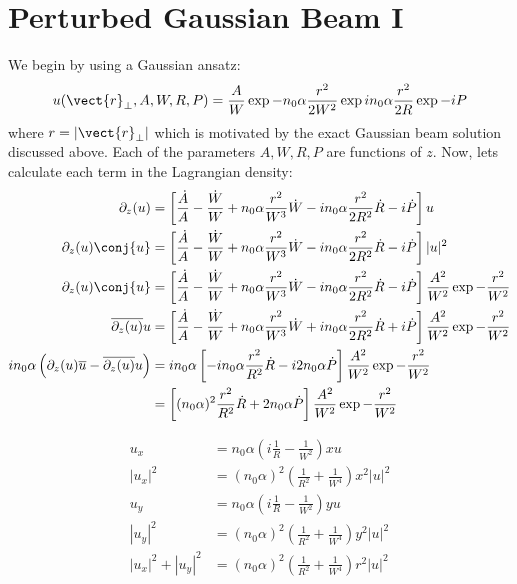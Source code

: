 \section{Perturbed Gaussian Beam I}
We begin by using a Gaussian ansatz:
\begin{equation}
 u(\vect{r}_{\perp},A,W,R,P) = \frac{A}{W} \exp{-n_0 \alpha \frac{r^2}{2W^2}} \exp{ i n_0 \alpha \frac{r^2}{2R}} \exp{- i P }
\end{equation}
where $r = |\vect{r}_{\perp}|$ which is motivated by the exact Gaussian beam solution discussed above.   Each of the parameters $A,W,R,P$ are functions of $z$.  Now, lets calculate each term in the Lagrangian density:
\begin{equation}
    \begin{split}
    \partial_{z}(u) &= \left[ \frac{\dot{A}}{A} - \frac{\dot{W}}{W} + n_0 \alpha \frac{r^2}{W^3} \dot{W} - i n_0 \alpha \frac{r^2}{2 R^2} \dot{R} - i \dot{P}  \right] u\\
     \partial_{z}(u)\conj{u} &= \left[ \frac{\dot{A}}{A} - \frac{\dot{W}}{W} + n_0 \alpha \frac{r^2}{W^3} \dot{W} - i n_0 \alpha \frac{r^2}{2 R^2} \dot{R} - i \dot{P}  \right] |u|^2 \\
     \partial_{z}(u)\conj{u} &=  \left[ \frac{\dot{A}}{A} - \frac{\dot{W}}{W} + n_0 \alpha \frac{r^2}{W^3} \dot{W} - i n_0 \alpha \frac{r^2}{2 R^2} \dot{R} - i \dot{P}  \right] \frac{A^2}{W^2}\exp{- \frac{r^2}{W^2}}\\
     \overline{\partial_{z}(u)}u &=  \left[ \frac{\dot{A}}{A} - \frac{\dot{W}}{W} + n_0 \alpha \frac{r^2}{W^3} \dot{W} + i n_0 \alpha \frac{r^2}{2 R^2} \dot{R} + i \dot{P}  \right] \frac{A^2}{W^2}\exp{- \frac{r^2}{W^2}}\\     
     i n_0 \alpha  \left(\partial_{z}(u) \overline{u} - \overline{\partial_{z}(u)}u\right) &=
      i n_0 \alpha \left[ - i n_0 \alpha \frac{r^2}{ R^2} \dot{R} - i 2 n_0 \alpha \dot{P}  \right] \frac{A^2}{W^2}\exp{- \frac{r^2}{W^2}}\\ 
      &= \left[ (n_0 \alpha)^2 \frac{r^2}{ R^2} \dot{R} + 2 n_0 \alpha \dot{P}  \right] \frac{A^2}{W^2}\exp{- \frac{r^2}{W^2}}\\
    \end{split}
\end{equation}


\begin{equation}
    \begin{split}
    u_{x} &= n_0 \alpha \left(i \frac{1}{R} - \frac{1}{W^2}\right) x u\\
    |u_{x}|^2 &= (n_0 \alpha)^2 \left(\frac{1}{R^2} + \frac{1}{W^4}\right) x^2 |u|^2\\
    u_{y} &= n_0 \alpha \left(i \frac{1}{R} - \frac{1}{W^2}\right) y u\\
    |u_{y}|^2 &= (n_0 \alpha)^2\left(\frac{1}{R^2} + \frac{1}{W^4}\right) y^2 |u|^2\\
    |u_{x}|^2 +|u_{y}|^2 &= (n_0 \alpha)^2 \left(\frac{1}{R^2} + \frac{1}{W^4}\right) r^2 |u|^2\\ 
    \end{split}
\end{equation}


